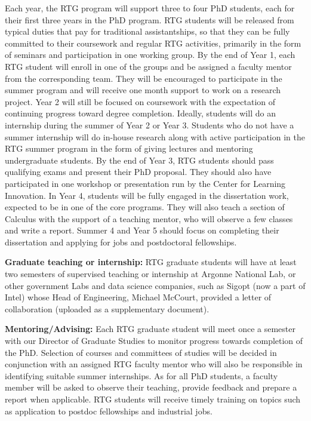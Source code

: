 \documentclass[11pt]{NSFamsart}
\begin{document}
Each year, the RTG program will support three to four PhD students, each for their first three years in the
PhD program. RTG students will be released from typical duties that pay for traditional assistantships, so
that they can be fully committed to their coursework and regular RTG activities, primarily in the form of
seminars and participation in one working group. By the end of Year 1, each RTG student will enroll in one
of the groups and be assigned a faculty mentor from the corresponding team. They will be encouraged to
participate in the summer program and will receive one month support to work on a research project. Year 2
will still be focused on coursework with the expectation of continuing progress toward degree completion.
Ideally, students will do an internship during the summer of Year 2 or Year 3. Students who do not have
a summer internship will do in-house research along with active participation in the RTG summer program
in the form of giving lectures and mentoring undergraduate students. By the end of Year 3, RTG students
should pass qualifying exams and present their PhD proposal. They should also have participated in one   workshop or presentation run by the Center for Learning Innovation. In Year 4, students will be fully engaged in the dissertation work, expected
to be in one of the core programs. They will also teach a section of Calculus with the support of a teaching
mentor, who will observe a few classes and write a report. Summer 4 and Year 5 should focus on completing
their dissertation and applying for jobs and postdoctoral fellowships.


 
\noindent
\textbf{Graduate teaching or internship:}
RTG graduate students will have at least two semesters of supervised teaching or internship at Argonne National Lab, or other government Labs and data science companies, such as     Sigopt (now a part of Intel) whose Head of Engineering, Michael McCourt, provided a letter  of collaboration (uploaded as a supplementary document).


\noindent
\textbf{Mentoring/Advising:} Each RTG graduate student will meet once a semester with our Director of Graduate
Studies to monitor progress towards completion of the PhD. Selection of courses and committees of studies
will be decided in conjunction with an assigned RTG faculty mentor who will also be responsible in identifying
suitable summer internships.   As for all PhD students, a faculty member will be asked to observe their
teaching, provide feedback and prepare a report when applicable. RTG students will receive timely training
on topics such as application to postdoc fellowships and industrial jobs.
 
\end{document}
